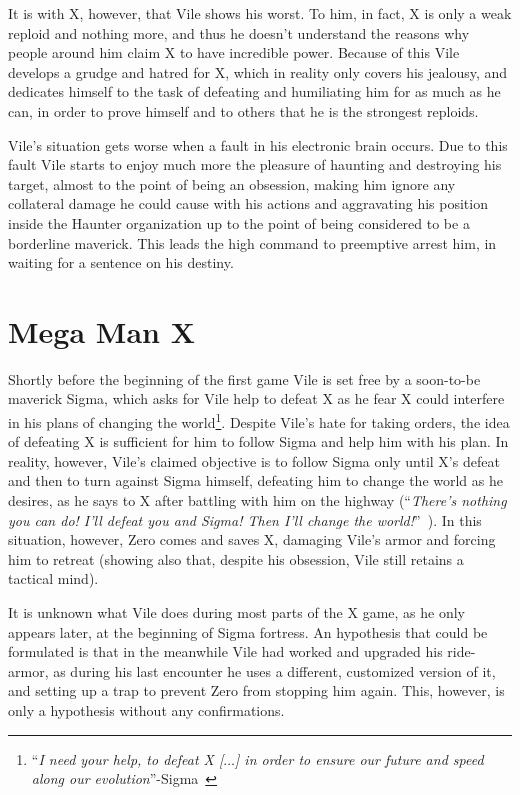 It is with X, however, that Vile shows his worst. To him, in fact, X is only a weak reploid and nothing more, and thus he doesn't understand the reasons why people around him claim X to have incredible power. Because of this Vile develops a grudge and hatred for X, which in reality only covers his jealousy, and dedicates himself to the task of defeating and humiliating him for as much as he can, in order to prove himself and to others that he is the strongest reploids.

Vile's situation gets worse when a fault in his electronic brain occurs. Due to this fault Vile starts to enjoy much more the pleasure of haunting and destroying his target, almost to the point of being an obsession, making him ignore any collateral damage he could cause with his actions and aggravating his position inside the Haunter organization up to the point of being considered to be a borderline maverick. This leads the high command  to preemptive arrest him, in waiting for a sentence on his destiny.

\section{Mega Man X}
Shortly before the beginning of the first game Vile is set free by a soon-to-be maverick Sigma, which asks for Vile help to defeat X as he fear X could interfere in his plans of changing the world\footnote{``\textit{I need your help, to defeat X [$\dots$] in order to ensure our future and speed along our evolution}''-Sigma~\cite{MHX:Vile_script}}. Despite Vile's hate for taking orders, the idea of defeating X is sufficient for him to follow Sigma and help him with his plan. In reality, however, Vile's claimed objective is to follow Sigma only until X's defeat and then to turn against Sigma himself, defeating him to change the world as he desires, as he says to X after battling with him on the highway (``\textit{There's nothing you can do! I'll defeat you and Sigma! Then I'll change the world!}''~\cite{wiki:MM_MHX_script}). In this situation, however, Zero comes and saves X, damaging Vile's armor and forcing him to retreat (showing also that, despite his obsession, Vile still retains a tactical mind). 

It is unknown what Vile does during most parts of the X game, as he only appears later, at the beginning of Sigma fortress. An hypothesis that could be  formulated is that in the meanwhile Vile had worked and upgraded his ride-armor, as during his last encounter he uses a different, customized version of it, and setting up a trap to prevent Zero from stopping him again. This, however, is only a hypothesis without any confirmations.


